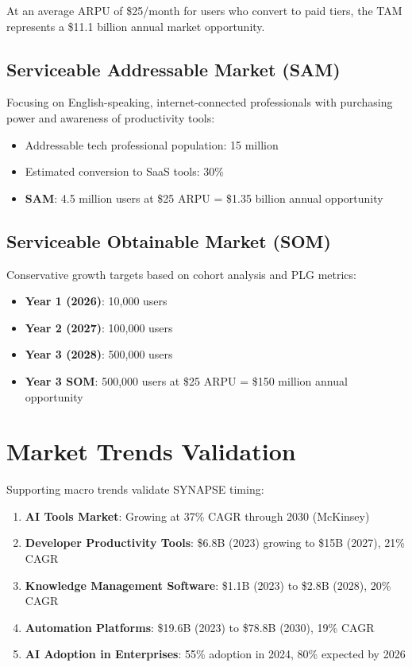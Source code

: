 \documentclass{report}
\begin{document}
At an average ARPU of \$25/month for users who convert to paid tiers, the TAM represents a \$11.1 billion annual market opportunity.

\subsection{Serviceable Addressable Market (SAM)}

Focusing on English-speaking, internet-connected professionals with purchasing power and awareness of productivity tools:

\begin{itemize}
    \item Addressable tech professional population: 15 million
    \item Estimated conversion to SaaS tools: 30\%
    \item \textbf{SAM}: 4.5 million users at \$25 ARPU = \$1.35 billion annual opportunity
\end{itemize}

\subsection{Serviceable Obtainable Market (SOM)}

Conservative growth targets based on cohort analysis and PLG metrics:

\begin{itemize}
    \item \textbf{Year 1 (2026)}: 10,000 users
    \item \textbf{Year 2 (2027)}: 100,000 users
    \item \textbf{Year 3 (2028)}: 500,000 users
    \item \textbf{Year 3 SOM}: 500,000 users at \$25 ARPU = \$150 million annual opportunity
\end{itemize}

\section{Market Trends Validation}

Supporting macro trends validate SYNAPSE timing:

\begin{enumerate}
    \item \textbf{AI Tools Market}: Growing at 37\% CAGR through 2030 (McKinsey)
    \item \textbf{Developer Productivity Tools}: \$6.8B (2023) growing to \$15B (2027), 21\% CAGR
    \item \textbf{Knowledge Management Software}: \$1.1B (2023) to \$2.8B (2028), 20\% CAGR
    \item \textbf{Automation Platforms}: \$19.6B (2023) to \$78.8B (2030), 19\% CAGR
    \item \textbf{AI Adoption in Enterprises}: 55\% adoption in 2024, 80\% expected by 2026
\end{enumerate}
\end{document}
